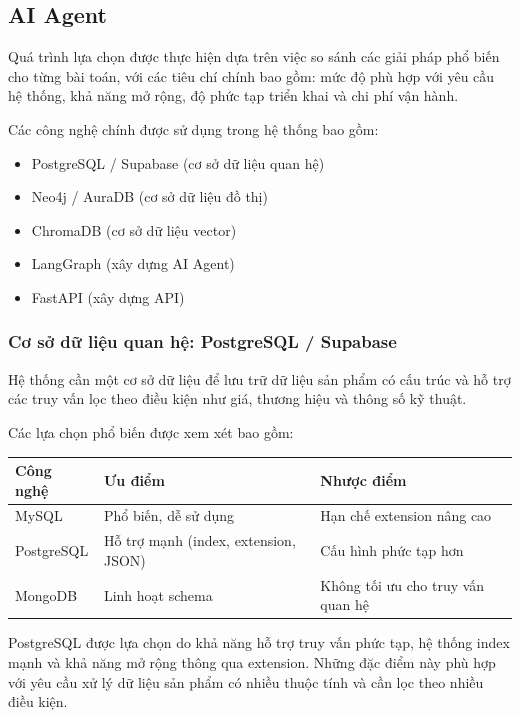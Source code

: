 \subsection{AI Agent}

Quá trình lựa chọn được thực hiện dựa trên việc so sánh các giải pháp phổ biến cho từng bài toán, với các tiêu chí chính bao gồm: mức độ phù hợp với yêu cầu hệ thống, khả năng mở rộng, độ phức tạp triển khai và chi phí vận hành.

Các công nghệ chính được sử dụng trong hệ thống bao gồm:

\begin{itemize}
\item PostgreSQL / Supabase (cơ sở dữ liệu quan hệ)
\item Neo4j / AuraDB (cơ sở dữ liệu đồ thị)
\item ChromaDB (cơ sở dữ liệu vector)
\item LangGraph (xây dựng AI Agent)
\item FastAPI (xây dựng API)
\end{itemize}

\subsubsection{Cơ sở dữ liệu quan hệ: PostgreSQL / Supabase}

Hệ thống cần một cơ sở dữ liệu để lưu trữ dữ liệu sản phẩm có cấu trúc và hỗ trợ các truy vấn lọc theo điều kiện như giá, thương hiệu và thông số kỹ thuật.

Các lựa chọn phổ biến được xem xét bao gồm:

\begin{tabular}{|p{2.5cm}|p{5.5cm}|p{5.5cm}|}
\hline
Công nghệ & Ưu điểm & Nhược điểm \\
\hline
MySQL & Phổ biến, dễ sử dụng & Hạn chế extension nâng cao \\
\hline
PostgreSQL & Hỗ trợ mạnh (index, extension, JSON) & Cấu hình phức tạp hơn \\
\hline
MongoDB & Linh hoạt schema & Không tối ưu cho truy vấn quan hệ \\
\hline
\end{tabular}

PostgreSQL được lựa chọn do khả năng hỗ trợ truy vấn phức tạp, hệ thống index mạnh và khả năng mở rộng thông qua extension. Những đặc điểm này phù hợp với yêu cầu xử lý dữ liệu sản phẩm có nhiều thuộc tính và cần lọc theo nhiều điều kiện.

